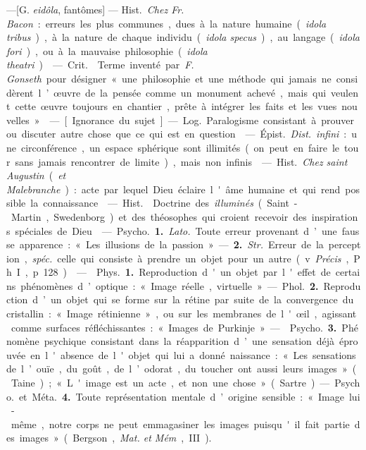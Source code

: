 \begin{itemize}[leftmargin=1cm, label=, itemsep=1pt]
 —[G. {\it eidôla}, fantômes] — \si{Hist.} {\it Chez Fr. Bacon} :
erreurs les plus communes, dues à la nature humaine ({\it idola tribus}), à
la nature de chaque individu ({\it idola specus}), au langage ({\it idola
fori}), ou à la mauvaise philosophie ({\it idola theatri}).

 — \si{Crit.}  Terme inventé par {\it F.
Gonseth} pour désigner « une philosophie et une méthode qui jamais ne
considèrent l’œuvre de la pensée comme un monument achevé, mais qui veulent
cette œuvre toujours en chantier, prête à intégrer les faits et les vues
nouvelles ».

 — [Ignorance du sujet] — \si{Log.} Paralogisme
consistant à prouver ou discuter autre chose que ce qui est en question.

 — \si{Épist.} {\it Dist.} {\it infini} : une circonférence, un
espace sphérique sont illimités (on peut en faire le tour sans jamais
rencontrer de limite), mais non infinis.

 — \si{Hist.} {\it Chez saint Augustin} ({\it et
Malebranche}) : acte par lequel Dieu éclaire l'âme humaine et qui rend
possible la connaissance.

 — \si{Hist.}  Doctrine des {\it illuminés}
(Saint-Martin, Swedenborg) et des théosophes qui croient recevoir des
inspirations spéciales de Dieu.

 — \si{Psycho.} {\bf 1.} {\it Lato.} Toute erreur provenant
d’une fausse apparence : « Les illusions de la passion ». — {\bf 2.}
{\it Str.} Erreur de la perception, {\it spéc.} celle qui consiste à prendre
un objet pour un autre (v. {\it Précis}, Ph. I, p. 128).

 —  \si{Phys.} {\bf 1.} Reproduction d'un objet par
l'effet de certains phénomènes d’optique : « Image réelle, virtuelle ». —
\si{Phol.} {\bf 2.} Reproduction d’un objet qui se forme sur la rétine par
suite de la convergence du cristallin : « Image rétinienne », ou sur les
membranes de l'œil, agissant comme surfaces réfléchissantes : « Images de
Purkinje ».

—  \si{Psycho.} {\bf 3.} Phénomène psychique consistant dans
la réapparition d’une sensation déjà éprouvée en l'absence de l'objet qui lui
a donné naissance : « Les sensations de l’ouïe, du goût, de l’odorat, du
toucher ont aussi leurs images » (Taine); « L'image est un acte, et non une
chose » (Sartre). — \si{Psycho.} et \si{Méta.} {\bf 4.} Toute représentation
mentale d’origine sensible : « Image lui-même, notre corps ne peut
emmagasiner les images puisqu'il fait partie des images » (Bergson, {\it Mat.
et Mém}, III).


\end{itemize}
